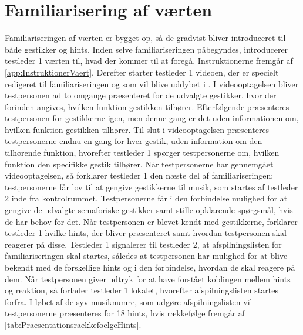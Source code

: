 \section{Familiarisering af værten}
\label{FamiliariseringSocialAccept}
% 
Familiariseringen af værten er bygget op, så de gradvist bliver introduceret til både gestikker og hints. Inden selve familiariseringen påbegyndes, introducerer testleder 1 værten til, hvad der kommer til at foregå. Instruktionerne fremgår af \autoref{app:InstruktionerVaert}. Derefter starter testleder 1 videoen, der er specielt redigeret til familiariseringen og som vil blive uddybet i . I videooptagelsen bliver testpersonen ad to omgange præsenteret for de udvalgte gestikker, hvor der forinden angives, hvilken funktion gestikken tilhører. Efterfølgende præsenteres testpersonen for gestikkerne igen, men denne gang er det uden informationen om, hvilken funktion gestikken tilhører. Til slut i videooptagelsen præsenteres testpersonerne endnu en gang for hver gestik, uden information om den tilhørende funktion, hvorefter testleder 1 spørger testpersonerne om, hvilken funktion den specifikke gestik tilhører. Når testpersonerne har gennemgået videooptagelsen, så forklarer testleder 1 den næste del af familiariseringen; testpersonerne får lov til at gengive gestikkerne til musik, som startes af testleder 2 inde fra kontrolrummet. Testpersonerne får i den forbindelse mulighed for at gengive de udvalgte semaforiske gestikker samt stille opklarende spørgsmål, hvis de har behov for det. Når testpersonen er blevet kendt med gestikkerne, forklarer testleder 1 hvilke hints, der bliver præsenteret samt hvordan testpersonen skal reagerer på disse. Testleder 1 signalerer til testleder 2, at afspilningslisten for familiariseringen skal startes, således at testpersonen har mulighed for at blive bekendt med de forskellige hints og i den forbindelse, hvordan de skal reagere på dem. Når testpersonen giver udtryk for at have forstået koblingen mellem hints og reaktion, så forlader testleder 1 lokalet, hvorefter afspilningslisten startes forfra. I løbet af de syv musiknumre, som udgøre afspilningslisten vil testpersonerne præsenteres for 18 hints, hvis rækkefølge fremgår af \autoref{tab:PraesentationsraekkefoelgeHints}.


